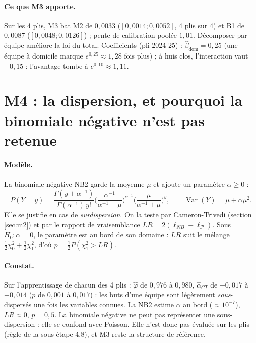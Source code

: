 \paragraph{Ce que M3 apporte.} Sur les 4 plis, M3 bat M2 de \(0{,}0033\) (\([0{,}0014 ;
0{,}0052]\), 4 plis sur 4) et B1 de \(0{,}0087\) (\([0{,}0048 ; 0{,}0126]\)) ; pente de calibration
poolée \(1{,}01\). Décomposer par équipe améliore la loi du total. Coefficients (pli 2024-25) :
\(\hat\beta_{\mathrm{dom}} = 0{,}25\) (une équipe à domicile marque \(e^{0{,}25} \approx 1{,}28\) fois
plus) ; à huis clos, l'interaction vaut \(-0{,}15\) : l'avantage tombe à \(e^{0{,}10} \approx 1{,}11\).

\section{M4 : la dispersion, et pourquoi la binomiale négative n'est pas retenue}
\label{sec:m4}

\paragraph{Modèle.} La binomiale négative NB2 garde la moyenne \(\mu\) et ajoute un paramètre
\(\alpha \ge 0\) :
\[
  P(Y = y) = \frac{\Gamma(y + \alpha^{-1})}{\Gamma(\alpha^{-1})\, y!}
  \Big(\frac{\alpha^{-1}}{\alpha^{-1} + \mu}\Big)^{\alpha^{-1}}
  \Big(\frac{\mu}{\alpha^{-1} + \mu}\Big)^{y},
  \qquad
  \operatorname{Var}(Y) = \mu + \alpha \mu^2 .
\]
Elle se justifie en cas de \emph{surdispersion}. On la teste par Cameron-Trivedi (section
\ref{sec:m2}) et par le rapport de vraisemblance \(LR = 2(\ell_{NB} - \ell_{\mathcal{P}})\). Sous
\(H_0 : \alpha = 0\), le paramètre est au bord de son domaine : \(LR\) suit le mélange
\(\tfrac12 \chi^2_0 + \tfrac12 \chi^2_1\), d'où \(p = \tfrac12 P(\chi^2_1 > LR)\).

\paragraph{Constat.} Sur l'apprentissage de chacun des 4 plis : \(\hat\varphi\) de \(0{,}976\) à
\(0{,}980\), \(\hat\alpha_{CT}\) de \(-0{,}017\) à \(-0{,}014\) (\(p\) de \(0{,}001\) à \(0{,}017\)) :
les buts d'une équipe sont légèrement \emph{sous}-dispersés une fois les variables connues. La NB2
estime \(\alpha\) au bord (\(\approx 10^{-7}\)), \(LR \approx 0\), \(p = 0{,}5\). La binomiale négative
ne peut pas représenter une sous-dispersion : elle se confond avec Poisson. Elle n'est donc pas
évaluée sur les plis (règle de la sous-étape 4.8), et M3 reste la structure de référence.

